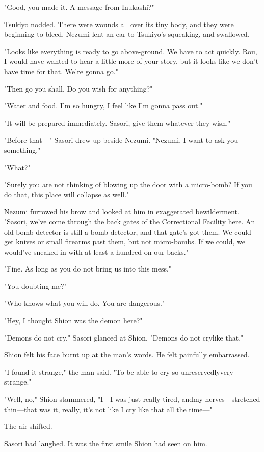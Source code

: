 "Good, you made it. A message from Inukashi?"

Tsukiyo nodded. There were wounds all over its tiny body, and they were
beginning to bleed. Nezumi lent an ear to Tsukiyo's squeaking, and
swallowed.

"Looks like everything is ready to go above-ground. We have to act
quickly. Rou, I would have wanted to hear a little more of your story,
but it looks like we don't have time for that. We're gonna go."

"Then go you shall. Do you wish for anything?"

"Water and food. I'm so hungry, I feel like I'm gonna pass out."

"It will be prepared immediately. Sasori, give them whatever they wish."

"Before that---" Sasori drew up beside Nezumi. "Nezumi, I want to ask you
something."

"What?"

"Surely you are not thinking of blowing up the door with a micro-bomb?
If you do that, this place will collapse as well."

Nezumi furrowed his brow and looked at him in exaggerated bewilderment.
"Sasori, we've come through the back gates of the Correctional Facility
here. An old bomb detector is still a bomb detector, and that gate's got
them. We could get knives or small firearms past them, but not
micro-bombs. If we could, we would've sneaked in with at least a hundred
on our backs."

"Fine. As long as you do not bring us into this mess."

"You doubting me?"

"Who knows what you will do. You are dangerous."

"Hey, I thought Shion was the demon here?"

"Demons do not cry." Sasori glanced at Shion. "Demons do not cry\el like
that."

Shion felt his face burnt up at the man's words. He felt painfully
embarrassed.

"I found it strange," the man said. "To be able to cry so
unreservedly\el very strange."

"Well, no," Shion stammered, "I---I was just really tired, and\el my
nerves---stretched thin---that was it, really, it's not like I cry like that
all the time---"

The air shifted.

Sasori had laughed. It was the first smile Shion had seen on him.

